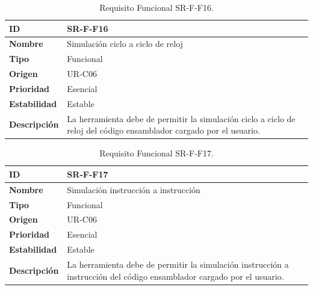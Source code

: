 \begin{center}
\begin{table}[htbp]
\centering
\begin{tabular}{@{}p{2.5cm} p{9cm}@{}} 
\toprule
\textbf{ID} 				& SR-F-F16 \\
\midrule
\textbf{Nombre} 			& Simulación ciclo a ciclo de reloj\\
\midrule
\textbf{Tipo} 			& Funcional \\
\midrule
\textbf{Origen} 			& UR-C06 \\
\midrule
\textbf{Prioridad}		& Esencial \\
\midrule
\textbf{Estabilidad} 		& Estable \\
\midrule
\textbf{Descripción} 	& La herramienta debe de permitir la simulación ciclo a ciclo de reloj del código ensamblador cargado por el usuario. \\
\bottomrule
\end{tabular}
\caption{Requisito Funcional SR-F-F16.}
\label{tab:srff16}
\end{table}
\end{center}

\begin{center}
\begin{table}[htbp]
\centering
\begin{tabular}{@{}p{2.5cm} p{9cm}@{}} 
\toprule
\textbf{ID} 				& SR-F-F17 \\
\midrule
\textbf{Nombre} 			& Simulación instrucción a instrucción\\
\midrule
\textbf{Tipo} 			& Funcional \\
\midrule
\textbf{Origen} 			& UR-C06 \\
\midrule
\textbf{Prioridad}		& Esencial \\
\midrule
\textbf{Estabilidad} 		& Estable \\
\midrule
\textbf{Descripción} 	& La herramienta debe de permitir la simulación instrucción a instrucción del código ensamblador cargado por el usuario. \\
\bottomrule
\end{tabular}
\caption{Requisito Funcional SR-F-F17.}
\label{tab:srff17}
\end{table}
\end{center}

